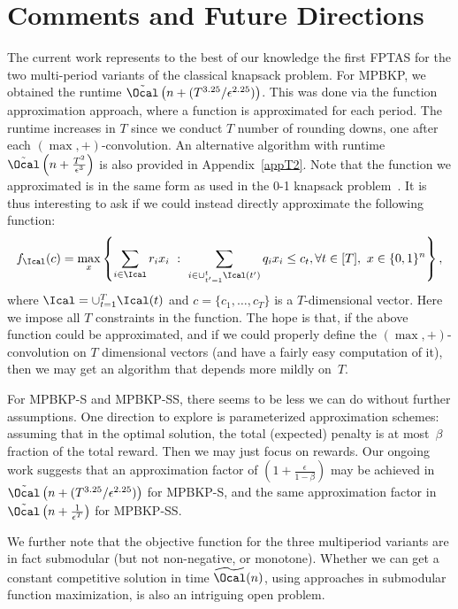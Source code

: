 \documentclass[11pt]{article}
\begin{document}
\section{Comments and Future Directions}\label{sec:conc}
The current work represents to the best of our knowledge the first FPTAS  for the two multi-period variants of the classical knapsack problem. For MPBKP, we obtained the runtime $\tilde{\Ocal}\left(n+(T^{3.25}/\epsilon^{2.25})\right)$. This was done via the function approximation approach, where a function is approximated for each period. The runtime increases in $T$ since we conduct $T$ number of rounding downs, one after each $(\max,+)$-convolution. An alternative algorithm with runtime $\tilde{\Ocal}\left(n+\frac{T^{2}}{\epsilon^{3}}\right)$ is also provided in Appendix~\ref{appT2}. Note that the function we approximated is in the same form as used in the 0-1 knapsack problem~\citep{chan:OASIcs:2018:8299}. It is thus interesting to ask if we could instead directly approximate the following function:
$$
f_{\Ical}(c) = \max_{x}\left\{\sum_{i\in\Ical}r_ix_i\ :\ \sum_{i\in\cup_{t'=1}^t\Ical(t')}q_ix_i\le c_t,\forall t\in[T],\ x\in\{0,1\}^n\right\},
$$
where $\Ical = \cup_{t=1}^T\Ical(t)$ and $c=\{c_1,\ldots,c_T\}$ is a $T$-dimensional vector. Here we impose all $T$ constraints in the function. The hope is that, if the above function could be approximated, and if we could properly define the $(\max,+)$-convolution on $T$ dimensional vectors (and have a fairly easy computation of it), then we may get an algorithm that depends more mildly on~$T$.

For MPBKP-S and MPBKP-SS, there seems to be less we can do without further assumptions. One direction to explore is  parameterized approximation schemes: assuming that in the optimal solution, the total (expected) penalty is at most~$\beta$ fraction of the total reward. Then we may just focus on rewards. Our ongoing work suggests that an approximation factor of $\left(1+\frac{\epsilon}{1-\beta}\right)$ may be achieved in $\tilde{\Ocal}\left(n+(T^{3.25}/\epsilon^{2.25})\right)$ for MPBKP-S, and the same approximation factor in $\tilde{\Ocal}\left(n+\frac{1}{\epsilon^{T}}\right)$ for MPBKP-SS. 

We further note that the objective function for the three multiperiod variants are in fact submodular (but not non-negative, or monotone). Whether we can get a constant competitive solution in time $\widetilde{\Ocal}(n)$, using approaches in submodular function maximization, is also an intriguing open problem. 
\end{document}
